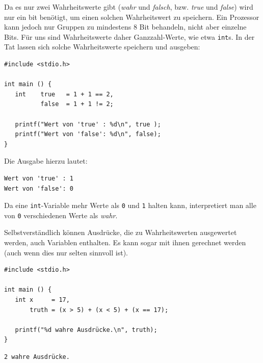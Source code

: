 Da es nur zwei Wahrheitswerte gibt (\emph{wahr} und \emph{falsch}, bzw. \emph{true} und \emph{false}) wird nur ein bit benötigt, um einen solchen Wahrheitswert zu speichern. Ein Prozessor kann jedoch nur Gruppen zu mindestens 8 Bit behandeln, nicht aber einzelne Bits. Für uns sind Wahrheitswerte daher Ganzzahl-Werte, wie etwa \texttt{int}s. In der Tat lassen sich solche Wahrheitswerte speichern und ausgeben:

\begin{codebox}
\begin{verbatim}
#include <stdio.h>

int main () {
   int    true   = 1 + 1 == 2, 
          false  = 1 + 1 != 2;
   
   printf("Wert von 'true' : %d\n", true );
   printf("Wert von 'false': %d\n", false);
}
\end{verbatim}
\end{codebox}

Die Ausgabe hierzu lautet:

\begin{cmdbox}
\begin{verbatim}
Wert von 'true' : 1
Wert von 'false': 0
\end{verbatim}
\end{cmdbox}

Da eine \texttt{int}-Variable mehr Werte als \texttt{0} und \texttt{1} halten kann, interpretiert man alle von \texttt{0} verschiedenen Werte als \emph{wahr}.

Selbstverständlich können Ausdrücke, die zu Wahrheitswerten ausgewertet werden, auch Variablen enthalten. Es kann sogar mit ihnen gerechnet werden (auch wenn dies nur selten sinnvoll ist).

\begin{codebox}
\begin{verbatim}
#include <stdio.h>

int main () {
   int x     = 17,
       truth = (x > 5) + (x < 5) + (x == 17);
   
   printf("%d wahre Ausdrücke.\n", truth);
}
\end{verbatim}
\end{codebox}

\begin{cmdbox}
\begin{verbatim}
2 wahre Ausdrücke.
\end{verbatim}
\end{cmdbox}

